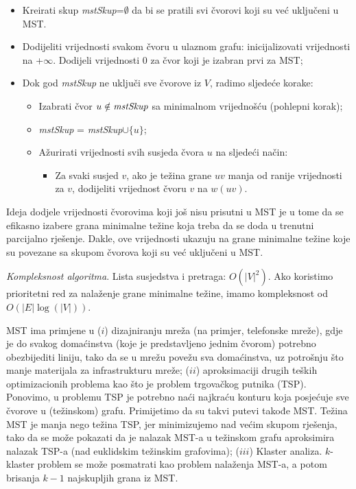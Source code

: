 \documentclass[a4paper, utf8, 11pt, colorlinks]{book}
\theoremstyle{definition}
\begin{document}
\begin{itemize}
	\item Kreirati skup \emph{mstSkup}=$\emptyset$ da bi se pratili svi čvorovi koji su već uključeni u MST.
	\item Dodijeliti vrijednosti svakom čvoru u ulaznom grafu: inicijalizovati vrijednosti na +$\infty$. 
	      Dodijeli vrijednosti 0 za čvor koji je izabran prvi za MST;
	\item Dok god \emph{mstSkup} ne uključi sve čvorove iz $V$, radimo sljedeće korake:
	\begin{itemize}
		\item Izabrati čvor $u\notin\emph{mstSkup} $ sa minimalnom vrijednošću (pohlepni korak);
		\item \emph{mstSkup} = \emph{mstSkup}$\cup \{u\}$;
		\item Ažurirati vrijednosti svih susjeda čvora $u$ na sljedeći način:
		     \begin{itemize}
		     	\item Za svaki susjed $v$, ako je težina grane $uv$ manja od
		             ranije vrijednosti za $v$, dodijeliti vrijednost čvoru $v$ na $w(uv)$. 		    
	         \end{itemize}
	\end{itemize}
\end{itemize}

Ideja dodjele vrijednosti čvorovima koji još nisu prisutni u MST je u tome da se efikasno izabere grana minimalne težine koja treba da se doda u trenutni parcijalno rješenje. Dakle, ove vrijednosti ukazuju na grane minimalne težine koje su povezane sa skupom čvorova koji su već uključeni u MST.

\emph{Kompleksnost algoritma}. Lista susjedstva i pretraga: $O(|V|^2)$. Ako  koristimo prioritetni red za nalaženje grane minimalne težine, imamo kompleksnost od $O( |E| \log(|V|))$. 

MST ima primjene u ($i$) dizajniranju mreža (na primjer, telefonske mreže), gdje je do svakog domaćinstva (koje je predstavljeno jednim čvorom) potrebno obezbijediti liniju, tako da se u mrežu povežu sva domaćinstva, uz potrošnju što manje materijala za infrastrukturu mreže; ($ii$) aproksimaciji drugih teških optimizacionih problema kao što je problem trgovačkog putnika (TSP). Ponovimo, u problemu TSP je potrebno naći najkraću konturu koja posjećuje sve čvorove u (težinskom) grafu. Primijetimo da su takvi putevi takođe MST. Težina MST je manja nego težina TSP, jer minimizujemo nad većim skupom rješenja, tako da se može pokazati da je nalazak MST-a u težinskom grafu aproksimira nalazak TSP-a (nad euklidskim težinskim grafovima); ($iii$) Klaster analiza. $k$-klaster problem  se može posmatrati kao problem nalaženja MST-a, a potom brisanja $k-1$ najskupljih grana iz MST. 
\end{document}
